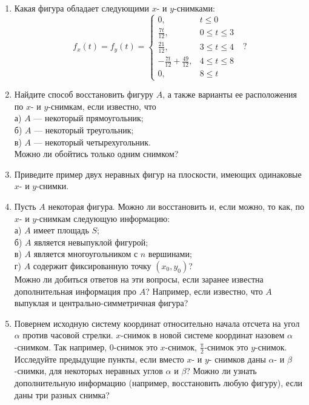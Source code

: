 \begin{enumerate}
\item Какая фигура обладает следующими $x$- и $y$-снимками:
$$f_x(t)= f_y(t)=\begin{cases}
0, &t\leq 0\\
\tfrac{7t}{12}, &0\leq t\leq 3\\
\tfrac{21}{12}, &3\leq t\leq 4\\
-\tfrac{7t}{12}+ \tfrac{49}{12},&4\leq t\leq 8\\
0,& 8\leq t
\end{cases} \,\,\,\,?$$

\item Найдите способ восстановить фигуру $A$, а также варианты ее расположения по $x$- и $y$-снимкам, если известно, что \\
а) $A$ --- некоторый прямоугольник; \\
б) $A$ --- некоторый треугольник; \\
в) $A$ --- некоторый четырехугольник.\\
Можно ли обойтись только одним снимком?

\item Приведите пример двух неравных фигур на плоскости, имеющих одинаковые $x$- и $y$-снимки.
\item Пусть $A$ некоторая фигура. Можно ли восстановить и, если можно, то как, по $x$- и $y$-снимкам следующую информацию:\\
а) $A$ имеет площадь $S$; \\
б) $A$ является невыпуклой фигурой;  \\
в) $A$ является многоугольником с $n$ вершинами; \\
г) $A$ содержит фиксированную точку $(x_0,y_0)$?\\
Можно ли добиться ответов на эти вопросы, если заранее известна дополнительная информация про $A$? Например, если известно, что $A$ выпуклая и центрально-симметричная фигура?
\item Повернем исходную систему координат относительно начала отсчета на угол $\alpha$ против часовой стрелки. $x$-снимок в новой  системе координат назовем $\alpha$-снимком. Так например, $0$-снимок это $x$-снимок, $\frac{\text{π}}{2}$-снимок это $y$-снимок.
Исследуйте предыдущие пункты, если вместо $x$- и $y$- снимков даны $\alpha$- и $\beta$-снимки, для некоторых неравных углов $\alpha$ и $\beta$? Можно ли узнать дополнительную информацию (например, восстановить любую фигуру), если даны три разных снимка?
\end{enumerate}


